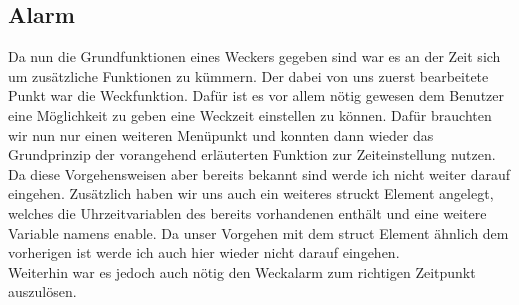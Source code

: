 \documentclass[openright,twoside,12pt,a4paper]{scrartcl}
\begin{document}
\begin{flushleft}
	 	\section{Alarm}
	 	Da nun die Grundfunktionen eines Weckers gegeben sind war es an der Zeit sich um zusätzliche Funktionen zu kümmern. Der dabei von uns zuerst bearbeitete Punkt war die Weckfunktion. Dafür ist es vor allem nötig gewesen dem Benutzer eine Möglichkeit zu geben eine Weckzeit einstellen zu können. Dafür brauchten wir nun nur einen weiteren Menüpunkt und konnten dann wieder das Grundprinzip der vorangehend erläuterten Funktion zur Zeiteinstellung nutzen. Da diese Vorgehensweisen aber bereits bekannt sind werde ich nicht weiter darauf eingehen. Zusätzlich haben wir uns auch ein weiteres struckt Element angelegt, welches die Uhrzeitvariablen des bereits vorhandenen enthält und eine weitere Variable namens enable. Da unser Vorgehen mit dem struct Element ähnlich dem vorherigen ist werde ich auch hier wieder nicht darauf eingehen.\\
	 	Weiterhin war es jedoch auch nötig den Weckalarm zum richtigen Zeitpunkt auszulösen.  

	\end{flushleft}
\end{document}
